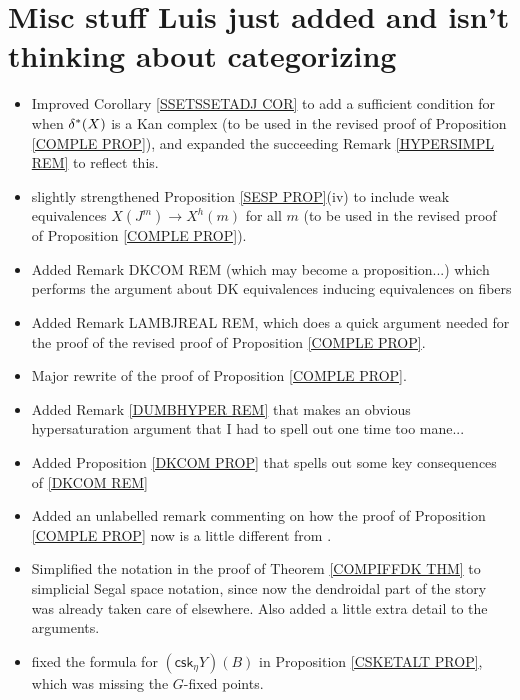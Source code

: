 \documentclass{article}
\begin{document}
\section{Misc stuff Luis just added and isn't thinking about categorizing}

\begin{itemize}

\item Improved Corollary \ref{SSETSSETADJ COR} to add a sufficient condition for when $\delta^{\**}(X)$ is a Kan complex (to be used in the revised proof of Proposition \ref{COMPLE PROP}), and expanded the succeeding Remark \ref{HYPERSIMPL REM} to reflect this.

\item slightly strengthened Proposition \ref{SESP PROP}(iv) to include weak equivalences $X(J^m) \to X^h(m)$ for all $m$ (to be used in the revised proof of Proposition \ref{COMPLE PROP}).


\item Added Remark DKCOM REM (which may become a proposition...) which performs the argument about DK equivalences inducing equivalences on fibers

\item Added Remark LAMBJREAL REM, which does a quick argument needed for the proof of the revised proof of Proposition \ref{COMPLE PROP}.

\item Major rewrite of the proof of Proposition \ref{COMPLE PROP}.

\item Added Remark \ref{DUMBHYPER REM} that makes an obvious hypersaturation argument that I had to spell out one time too mane...

\item Added Proposition \ref{DKCOM PROP} that spells out some key consequences of \eqref{DKCOM REM}

\item Added an unlabelled remark commenting on how the proof of Proposition \ref{COMPLE PROP} now is a little different from \cite{Rez01}. 

\item Simplified the notation in the proof of Theorem \ref{COMPIFFDK THM} to simplicial Segal space notation, since now the dendroidal part of the story was already taken care of elsewhere. Also added a little extra detail to the arguments.


\item fixed the formula for $(\mathsf{csk}_{\eta} Y)(B)$ in Proposition \ref{CSKETALT PROP}, which was missing the $G$-fixed points.

\end{itemize}


{}


\end{document}
